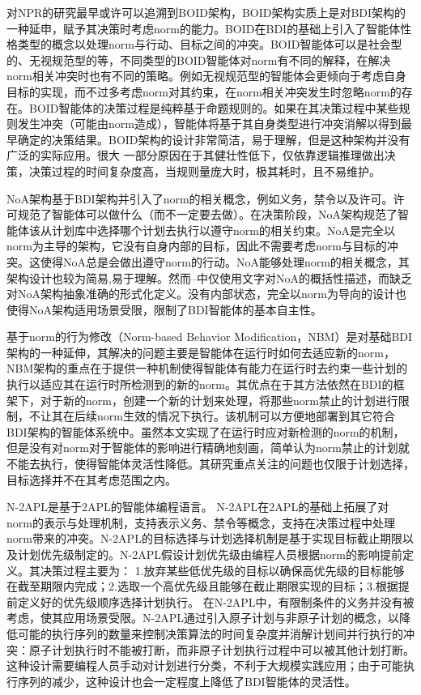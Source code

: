 对NPR的研究最早或许可以追溯到BOID架构\cite{DBLP:conf/agents/BroersenDHHT01}，BOID架构实质上是对BDI架构的一种延申，赋予其决策时考虑norm的能力。BOID在BDI的基础上引入了智能体性格类型的概念以处理norm与行动、目标之间的冲突。BOID智能体可以是社会型的、无视规范型的等，不同类型的BOID智能体对norm有不同的解释，在解决norm相关冲突时也有不同的策略。例如无视规范型的智能体会更倾向于考虑自身目标的实现，而不过多考虑norm对其约束，在norm相关冲突发生时忽略norm的存在。BOID智能体的决策过程是纯粹基于命题规则的。如果在其决策过程中某些规则发生冲突（可能由norm造成），智能体将基于其自身类型进行冲突消解以得到最早确定的决策结果。BOID架构的设计非常简洁，易于理解，但是这种架构并没有广泛的实际应用。很大 一部分原因在于其健壮性低下，仅依靠逻辑推理做出决策，决策过程的时间复杂度高，当规则量庞大时，极其耗时，且不易维护。

NoA\cite{DBLP:conf/ijcai/KollingbaumN03}架构基于BDI架构并引入了norm的相关概念，例如义务，禁令以及许可。许可规范了智能体可以做什么（而不一定要去做）。在决策阶段，NoA架构规范了智能体该从计划库中选择哪个计划去执行以遵守norm的相关约束。NoA是完全以norm为主导的架构，它没有自身内部的目标，因此不需要考虑norm与目标的冲突。这使得NoA总是会做出遵守norm的行动。NoA能够处理norm的相关概念，其架构设计也较为简易,易于理解。然而--中仅使用文字对NoA的概括性描述，而缺乏对NoA架构抽象准确的形式化定义。没有内部状态，完全以norm为导向的设计也使得NoA架构适用场景受限，限制了BDI智能体的基本自主性。


基于norm的行为修改（Norm-based Behavior Modification，NBM）\cite{DBLP:conf/atal/MeneguzziL09}是对基础BDI架构的一种延伸，其解决的问题主要是智能体在运行时如何去适应新的norm，NBM架构的重点在于提供一种机制使得智能体有能力在运行时去约束一些计划的执行以适应其在运行时所检测到的新的norm。其优点在于其方法依然在BDI的框架下，对于新的norm，创建一个新的计划来处理，将那些norm禁止的计划进行限制，不让其在后续norm生效的情况下执行。该机制可以方便地部署到其它符合BDI架构的智能体系统中。虽然本文实现了在运行时应对新检测的norm的机制，但是没有对norm对于智能体的影响进行精确地刻画，简单认为norm禁止的计划就不能去执行，使得智能体灵活性降低。其研究重点关注的问题也仅限于计划选择，目标选择并不在其考虑范围之内。

N-2APL\cite{DBLP:conf/aamas/AlechinaDL12}是基于2APL\cite{DBLP:journals/aamas/Dastani08}的智能体编程语言。 N-2APL在2APL的基础上拓展了对norm的表示与处理机制，支持表示义务、禁令等概念，支持在决策过程中处理norm带来的冲突。N-2APL的目标选择与计划选择机制是基于实现目标截止期限以及计划优先级制定的。N-2APL假设计划优先级由编程人员根据norm的影响提前定义。其决策过程主要为： 1.放弃某些低优先级的目标以确保高优先级的目标能够在截至期限内完成；2.选取一个高优先级且能够在截止期限实现的目标；3.根据提前定义好的优先级顺序选择计划执行。
在N-2APL中，有限制条件的义务并没有被考虑，使其应用场景受限。N-2APL通过引入原子计划与非原子计划的概念，以降低可能的执行序列的数量来控制决策算法的时间复杂度并消解计划间并行执行的冲突：原子计划执行时不能被打断，而非原子计划执行过程中可以被其他计划打断。这种设计需要编程人员手动对计划进行分类，不利于大规模实践应用；由于可能执行序列的减少，这种设计也会一定程度上降低了BDI智能体的灵活性。

